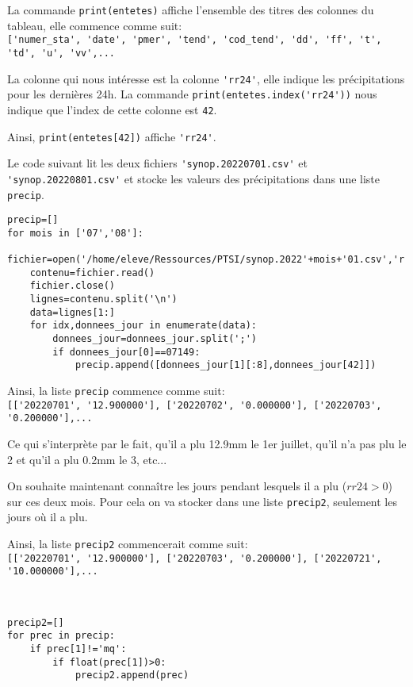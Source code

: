 La commande \verb?print(entetes)? affiche l'ensemble des titres des colonnes du tableau, elle commence comme suit: \\
\verb?['numer_sta', 'date', 'pmer', 'tend', 'cod_tend', 'dd', 'ff', 't', 'td', 'u', 'vv',...?

La colonne qui nous intéresse est la colonne \verb?'rr24'?, elle indique les précipitations pour les dernières 24h. La commande \verb?print(entetes.index('rr24'))? nous indique que l'index de cette colonne est \verb?42?.

Ainsi, \verb?print(entetes[42])? affiche \verb?'rr24'?.

Le code suivant lit les deux fichiers \verb?'synop.20220701.csv'? et \verb?'synop.20220801.csv'? et stocke les valeurs des précipitations dans une liste \verb?precip?.

\begin{verbatim}
precip=[]
for mois in ['07','08']:    
    fichier=open('/home/eleve/Ressources/PTSI/synop.2022'+mois+'01.csv','r')
    contenu=fichier.read()
    fichier.close()
    lignes=contenu.split('\n')
    data=lignes[1:]
    for idx,donnees_jour in enumerate(data):
        donnees_jour=donnees_jour.split(';')
        if donnees_jour[0]==07149:
            precip.append([donnees_jour[1][:8],donnees_jour[42]])
\end{verbatim}

Ainsi, la liste \verb?precip? commence comme suit:\\
\verb?[['20220701', '12.900000'], ['20220702', '0.000000'], ['20220703', '0.200000'],...?

Ce qui s'interprète par le fait, qu'il a plu 12.9mm le 1er juillet, qu'il n'a pas plu le 2 et qu'il a plu 0.2mm le 3, etc...

On souhaite maintenant connaître les jours pendant lesquels il a plu ($rr24>0$) sur ces deux mois. Pour cela on va stocker dans une liste \verb?precip2?, seulement les jours où il a plu.

Ainsi, la liste \verb?precip2? commencerait comme suit:\\
\verb?[['20220701', '12.900000'], ['20220703', '0.200000'], ['20220721', '10.000000'],...?


\begin{solution}~\ \\
\begin{verbatim}
precip2=[]
for prec in precip:
    if prec[1]!='mq':
        if float(prec[1])>0:
            precip2.append(prec)
\end{verbatim}
\end{solution}

